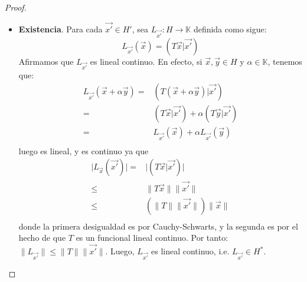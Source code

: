 \documentclass[12pt]{report}
\theoremstyle{largebreak}
\newcommand\abs[1]{\ensuremath{\big|#1\big|}}
\newcommand\cf[3]{\ensuremath{#1:#2\rightarrow#3}}
\newcommand\pint[2]{\ensuremath{\left(#1\big|#2\right)}}
\newcommand\norm[1]{\ensuremath{\|#1\|}}
\begin{document}
\begin{proof}
\begin{itemize}
            \item \textbf{Existencia}. Para cada $\vec{x'}\in H'$, sea $\cf{L_{\vec{x'}}}{H}{\mathbb{K}}$ definida como sigue:
            \begin{equation*}
                L_{\vec{x'}}(\vec{x})=\pint{T\vec{x}}{\vec{x'}}
            \end{equation*}
            Afirmamos que $L_{\vec{x'}}$ es lineal continuo. En efecto, si $\vec{x},\vec{y}\in H$ y $\alpha\in\mathbb{K}$, tenemos que:
            \begin{equation*}
                \begin{split}
                    L_{\vec{x'}}(\vec{x}+\alpha\vec{y})=&\pint{T(\vec{x}+\alpha\vec{y})}{\vec{x'}} \\
                    =&\pint{T\vec{x}}{\vec{x'}}+\alpha\pint{T\vec{y}}{\vec{x'}} \\
                    =& L_{\vec{x'}}(\vec{x})+\alpha L_{\vec{x'}}(\vec{y})\\
                \end{split}
            \end{equation*}
            luego es lineal, y es continuo ya que
            \begin{equation*}
                \begin{split}
                    \abs{L_{\vec{x}}(\vec{x'})}=&\abs{\pint{T\vec{x}}{\vec{x'}}}\\
                    \leq&\norm{T\vec{x}}\norm{\vec{x'}} \\
                    \leq&(\norm{T}\norm{\vec{x'}})\norm{\vec{x}} \\
                \end{split}
            \end{equation*}
            donde la primera desigualdad es por Cauchy-Schwarts, y la segunda es por el hecho de que $T$ es un funcional lineal continuo. Por tanto: $\norm{L_{\vec{x'}}}\leq\norm{T}\norm{\vec{x'}}$. Luego, $L_{\vec{x'}}$ es lineal continuo, i.e. $L_{\vec{x'}}\in H^*$.


\end{itemize}
\end{proof}
\end{document}
